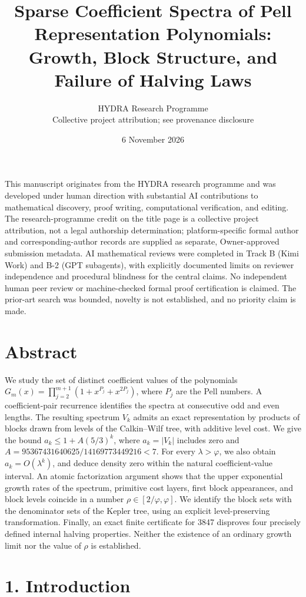 \documentclass[11pt]{article}
\title{Sparse Coefficient Spectra of Pell Representation Polynomials: Growth, Block Structure, and Failure of Halving Laws}
\author{HYDRA Research Programme\\{\small Collective project attribution; see provenance disclosure}}
\date{6 November 2026}
\begin{document}
\maketitle

This manuscript originates from the HYDRA research programme and was developed under human direction with substantial AI contributions to mathematical discovery, proof writing, computational verification, and editing. The research-programme credit on the title page is a collective project attribution, not a legal authorship determination; platform-specific formal author and corresponding-author records are supplied as separate, Owner-approved submission metadata. AI mathematical reviews were completed in Track B (Kimi Work) and B-2 (GPT subagents), with explicitly documented limits on reviewer independence and procedural blindness for the central claims. No independent human peer review or machine-checked formal proof certification is claimed. The prior-art search was bounded, novelty is not established, and no priority claim is made.

\section*{Abstract}

We study the set of distinct coefficient values of the polynomials \(G_m(x)=\prod_{j=2}^{m+1}(1+x^{P_j}+x^{2P_j})\), where \(P_j\) are the Pell numbers. A coefficient-pair recurrence identifies the spectra at consecutive odd and even lengths. The resulting spectrum \(V_k\) admits an exact representation by products of blocks drawn from levels of the Calkin--Wilf tree, with additive level cost. We give the bound \(a_k\le1+A(5/3)^k\), where \(a_k=|V_k|\) includes zero and \(A=95367431640625/14169773449216<7\). For every \(\lambda>\varphi\), we also obtain \(a_k=O(\lambda^k)\), and deduce density zero within the natural coefficient-value interval. An atomic factorization argument shows that the upper exponential growth rates of the spectrum, primitive cost layers, first block appearances, and block levels coincide in a number \(\rho\in[2/\varphi,\varphi]\). We identify the block sets with the denominator sets of the Kepler tree, using an explicit level-preserving transformation. Finally, an exact finite certificate for 3847 disproves four precisely defined internal halving properties. Neither the existence of an ordinary growth limit nor the value of \(\rho\) is established.

\section*{1. Introduction}
\end{document}
